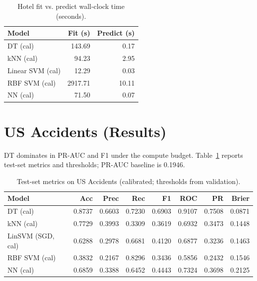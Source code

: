 \documentclass[conference]{IEEEtran}
\newcommand{\datasetB}{US Accidents}
\begin{document}
\begin{table}[htbp]
\caption{Hotel fit vs. predict wall-clock time (seconds).}
\begin{center}
\begin{tabular}{|l|r|r|}
\hline
Model & Fit (s) & Predict (s) \\
\hline
DT (cal) & 143.69 & 0.17 \\
 kNN (cal) & 94.23 & 2.95 \\
 Linear SVM (cal) & 12.29 & 0.03 \\
 RBF SVM (cal) & 2917.71 & 10.11 \\
 NN (cal) & 71.50 & 0.07 \\
\hline
\end{tabular}
\end{center}
\end{table}

\section{\datasetB{} (Results)}
DT dominates in PR-AUC and F1 under the compute budget. Table~\ref{tab:accidents-metrics} reports test-set metrics and thresholds; PR-AUC baseline is 0.1946.

\begin{table}[htbp]
\caption{Test-set metrics on \datasetB{} (calibrated; thresholds from validation).}
\begin{center}
\begin{tabular}{|l|r|r|r|r|r|r|r|}
\hline
Model & Acc & Prec & Rec & F1 & ROC & PR & Brier \\
\hline
DT (cal) & 0.8737 & 0.6603 & 0.7230 & 0.6903 & 0.9107 & 0.7508 & 0.0871 \\
kNN (cal) & 0.7729 & 0.3993 & 0.3309 & 0.3619 & 0.6932 & 0.3473 & 0.1448 \\
LinSVM (SGD, cal) & 0.6288 & 0.2978 & 0.6681 & 0.4120 & 0.6877 & 0.3236 & 0.1463 \\
RBF SVM (cal) & 0.3832 & 0.2167 & 0.8296 & 0.3436 & 0.5856 & 0.2432 & 0.1546 \\
NN (cal) & 0.6859 & 0.3388 & 0.6452 & 0.4443 & 0.7324 & 0.3698 & 0.2125 \\
\hline
\end{tabular}
\label{tab:accidents-metrics}
\end{center}
\end{table}
\end{document}
